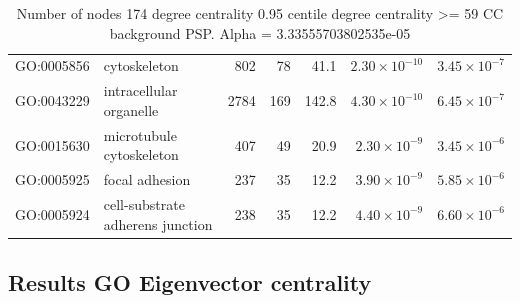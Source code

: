 \begin{table}[ht]
\begin{adjustbox}{max width=\textwidth}
\begin{tabular}{llrrrrr}
  GO:0005856 & cytoskeleton & 802 & 78 & 41.1 & $2.30 \times 10^{-10}$ & $3.45 \times 10^{-7}$ \\ 
  GO:0043229 & intracellular organelle & 2784 & 169 & 142.8 & $4.30 \times 10^{-10}$ & $6.45 \times 10^{-7}$ \\ 
  GO:0015630 & microtubule cytoskeleton & 407 & 49 & 20.9 & $2.30 \times 10^{-9}$ & $3.45 \times 10^{-6}$ \\ 
  GO:0005925 & focal adhesion & 237 & 35 & 12.2 & $3.90 \times 10^{-9}$ & $5.85 \times 10^{-6}$ \\ 
  GO:0005924 & cell-substrate adherens junction & 238 & 35 & 12.2 & $4.40 \times 10^{-9}$ & $6.60 \times 10^{-6}$ \\ 
   \hline
\end{tabular}
\end{adjustbox}
\caption{Number of nodes 174 degree centrality 0.95 centile  degree centrality >= 59 CC background PSP. Alpha = 3.33555703802535e-05} 
\label{tab:Number of nodes 174 degree centrality 0.95 centile  degree centrality >= 59 CC background PSP. Alpha = 3.33555703802535e-05}
\end{table}


\subsection{Results GO Eigenvector centrality}




